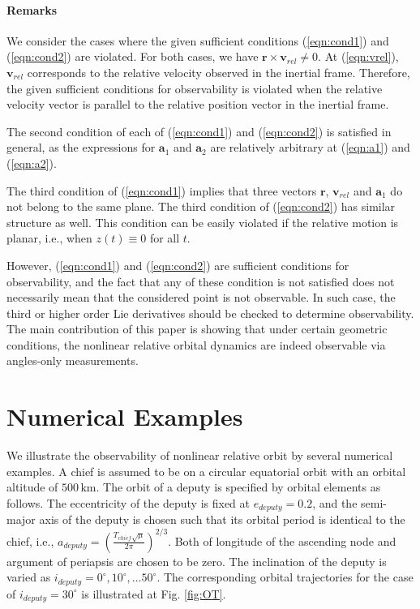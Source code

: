 \documentclass[12pt,letterpaper]{ISSFD_v01}
\newcommand{\refeqn}[1]{(\ref{eqn:#1})}
\renewcommand{\r}{\mathbf{r}}
\begin{document}
\paragraph{Remarks} We consider the cases where the given sufficient conditions \refeqn{cond1} and \refeqn{cond2} are violated. 
For both cases, we have $\r\times\mathbf{v}_{rel}\neq 0$. At \refeqn{vrel}, $\mathbf{v}_{rel}$ corresponds to the relative velocity observed in the inertial frame. Therefore, the given sufficient conditions for observability is violated when the relative velocity vector is parallel to the relative position vector in the inertial frame. 

The second condition of each of \refeqn{cond1} and \refeqn{cond2} is satisfied in general, as the expressions for $\mathbf{a}_1$ and $\mathbf{a}_2$ are relatively arbitrary at \refeqn{a1} and \refeqn{a2}. 

The third condition of \refeqn{cond1} implies that three vectors $\r$, $\mathbf{v}_{rel}$ and $\mathbf{a}_1$ do not belong to the same plane. The third condition of \refeqn{cond2} has similar structure as well. This condition can be easily violated if the relative motion is planar, i.e., when $z(t)\equiv 0$ for all $t$. 

However, \refeqn{cond1} and \refeqn{cond2} are sufficient conditions for observability, and the fact that any of these condition is not satisfied does not necessarily mean that the considered point is not observable. In such case, the third or higher order Lie derivatives should be checked to determine observability. The main contribution of this paper is showing that under certain geometric conditions, the nonlinear relative orbital dynamics are indeed observable via angles-only measurements. 

\section{Numerical Examples}

We illustrate the observability of nonlinear relative orbit by several numerical examples. A chief is assumed to be on a circular equatorial orbit with an orbital altitude of $500\,\mathrm{km}$. The orbit of a deputy is specified by orbital elements as follows. The eccentricity of the deputy is fixed at $e_{deputy}=0.2$, and the semi-major axis of the deputy is chosen such that its orbital period is identical to the chief, i.e., $a_{deputy} = (\frac{T_{chief}\sqrt{\mu}}{2\pi})^{2/3}$. Both of longitude of the ascending node and argument of periapsis are chosen to be zero. The inclination of the deputy is varied as $i_{deputy}=0^\circ,10^\circ,\ldots 50^\circ$. The corresponding orbital trajectories for the case of $i_{deputy}=30^\circ$ is illustrated at Fig. \ref{fig:OT}.
\end{document}

